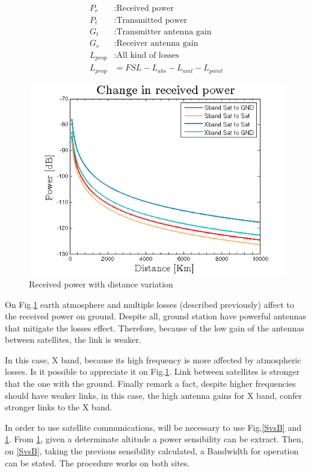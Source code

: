 \begin{align*}
		P_r&:\text{Received power}\\
		P_t&:\text{Transmitted power}\\
		G_t&:\text{Transmitter antenna gain}\\
		G_r&:\text{Receiver antenna gain}\\
		L_{prop}&:\text{All kind of losses}\\
		L_{prop}&=FSL -L_{abs}-L_{aml}-L_{point}  	
\end{align*}

\begin{figure}[H]
\includegraphics[scale=0.9]{./sections/SatelliteDept/sections/images/friisCases}
\centering
\caption{Received power with distance variation}
\label{friis}
\end{figure}

On Fig.\ref{friis} earth atmosphere and multiple losses (described previously) affect to the received power on ground. Despite all, ground station have powerful antennas that mitigate the losses effect. Therefore, because of the low gain of the antennas between satellites, the link is weaker.

In this case, X band, because its high frequency is more affected by atmospheric losses. Is it possible to appreciate it on Fig.\ref{friis}. Link between satellites is stronger that the one with the ground. Finally remark a fact, despite higher frequencies should have weaker links, in this case, the high antenna gains for X band, confer stronger links to the X band.

In order to use satellite communications, will be necessary to use Fig.\ref{SvsB} and \ref{friis}. From \ref{friis}, given a determinate altitude a power sensibility can be extract. Then, on \ref{SvsB}, taking the previous sensibility calculated, a Bandwidth for operation can be stated. The procedure works on both sites.